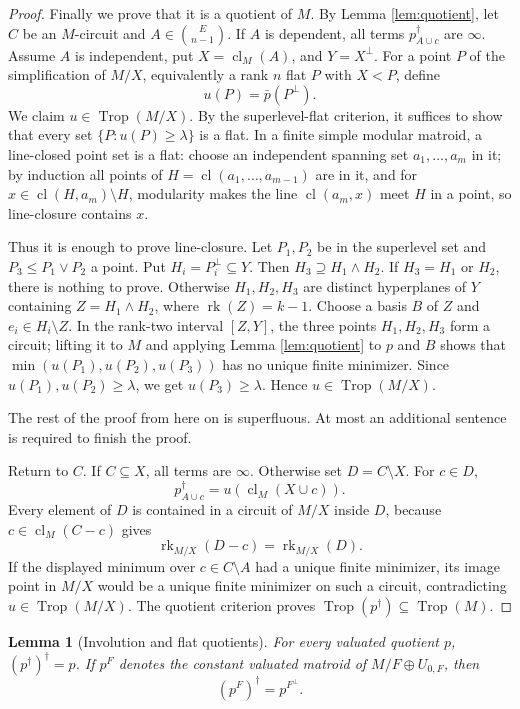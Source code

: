 \documentclass[12pt]{article}
\newtheorem{lemma}[theorem]{Lemma}
\theoremstyle{definition}
\newcommand{\Trop}{\operatorname{Trop}}
\newcommand{\rk}{\operatorname{rk}}
\newcommand{\cl}{\operatorname{cl}}
\newcommand{\binomE}[1]{\binom{E}{#1}}
\newcommand{\review}[1]{\begin{reviewbox}#1\end{reviewbox}}
\begin{document}
\begin{proof}
Finally we prove that it is a quotient of \(M\).  By Lemma \ref{lem:quotient}, let \(C\) be an \(M\)-circuit and \(A\in\binomE{n-1}\).  If \(A\) is dependent, all terms \(p^\dagger_{A\cup c}\) are \(\infty\).  Assume \(A\) is independent, put \(X=\cl_M(A)\), and \(Y=X^\perp\).  For a point \(P\) of the simplification of \(M/X\), equivalently a rank \(n\) flat \(P\) with \(X<P\), define
\[
u(P)=\bar p(P^\perp).
\]
We claim \(u\in\Trop(M/X)\).  By the superlevel-flat criterion, it suffices to show that every set \(\{P:u(P)\ge\lambda\}\) is a flat.  In a finite simple modular matroid, a line-closed point set is a flat: choose an independent spanning set \(a_1,\ldots,a_m\) in it; by induction all points of \(H=\cl(a_1,\ldots,a_{m-1})\) are in it, and for \(x\in\cl(H,a_m)\setminus H\), modularity makes the line \(\cl(a_m,x)\) meet \(H\) in a point, so line-closure contains \(x\).

Thus it is enough to prove line-closure.  Let \(P_1,P_2\) be in the superlevel set and \(P_3\le P_1\vee P_2\) a point.  Put \(H_i=P_i^\perp\subseteq Y\).  Then \(H_3\supseteq H_1\wedge H_2\).  If \(H_3=H_1\) or \(H_2\), there is nothing to prove.  Otherwise \(H_1,H_2,H_3\) are distinct hyperplanes of \(Y\) containing \(Z=H_1\wedge H_2\), where \(\rk(Z)=k-1\).  Choose a basis \(B\) of \(Z\) and \(e_i\in H_i\setminus Z\).  In the rank-two interval \([Z,Y]\), the three points \(H_1,H_2,H_3\) form a circuit; lifting it to \(M\) and applying Lemma \ref{lem:quotient} to \(p\) and \(B\) shows that \(\min(u(P_1),u(P_2),u(P_3))\) has no unique finite minimizer.  Since \(u(P_1),u(P_2)\ge\lambda\), we get \(u(P_3)\ge\lambda\).  Hence \(u\in\Trop(M/X)\).

\review{The rest of the proof from here on is superfluous. At most an additional sentence is required to finish the proof.}
Return to \(C\).  If \(C\subseteq X\), all terms are \(\infty\).  Otherwise set \(D=C\setminus X\).  For \(c\in D\),
\[
p^\dagger_{A\cup c}=u(\cl_M(X\cup c)).
\]
Every element of \(D\) is contained in a circuit of \(M/X\) inside \(D\), because \(c\in\cl_M(C-c)\) gives
\[
\rk_{M/X}(D-c)=\rk_{M/X}(D).
\]
If the displayed minimum over \(c\in C\setminus A\) had a unique finite minimizer, its image point in \(M/X\) would be a unique finite minimizer on such a circuit, contradicting \(u\in\Trop(M/X)\).  The quotient criterion proves \(\Trop(p^\dagger)\subseteq\Trop(M)\).
\end{proof}

\begin{lemma}[Involution and flat quotients]\label{lem:invflat}
For every valuated quotient \(p\), \((p^\dagger)^\dagger=p\).  If \(p^F\) denotes the constant valuated matroid of \(M/F\oplus U_{0,F}\), then
\[
(p^F)^\dagger=p^{F^\perp}.
\]
\end{lemma}
\end{document}
